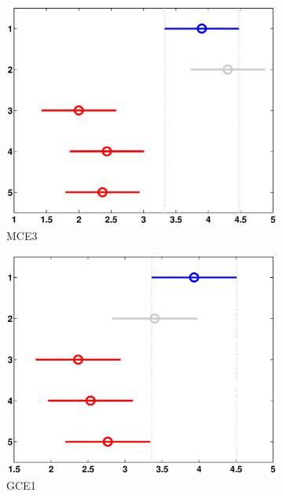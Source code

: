 \begin{figure}
\begin{subfigure}[b]{0.49\linewidth}
		\includegraphics[width=\linewidth]{Figures/A-NMELA_FB_P3}
		\caption{MCE3} \label{fig:M3} 
	\end{subfigure}
	\begin{subfigure}[b]{0.49\linewidth}
		\includegraphics[width=\linewidth]{Figures/A-NMELA_FB_P4}
		\caption{GCE1} \label{fig:M4} 
	\end{subfigure}
	\begin{subfigure}[b]{0.49\linewidth}

\end{subfigure}
\end{figure}
